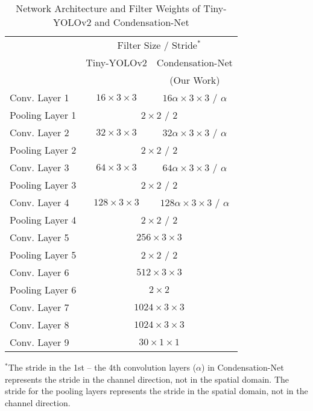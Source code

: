 \documentclass[10pt,twocolumn,letterpaper]{article}
\begin{document}
\begin{table}
\begin{center}
\begin{tabular}{l|c|c}
\hline
  & \multicolumn{2}{c}{Filter Size / Stride$^{*}$}   \\
  \cline{2-3}
  & Tiny-YOLOv2 & Condensation-Net  \\
  &    ~\cite{Redmon17, Wai18}  & (Our Work)  \\
\hline\hline
Conv. Layer 1    & $16 \times 3 \times 3$    & $16 \alpha \times 3 \times 3$ / $\alpha$\\
\hline
Pooling Layer 1  & \multicolumn{2}{c}{$2 \times 2$ / $2$}\\          
\hline
Conv. Layer 2    & $32 \times 3 \times 3$    & $32 \alpha \times 3 \times 3$ / $\alpha$\\
\hline
Pooling Layer 2  & \multicolumn{2}{c}{$2 \times 2$ / $2$}\\          
\hline
Conv. Layer 3    & $64 \times 3 \times 3$    & $64 \alpha \times 3 \times 3$ / $\alpha$\\
\hline
Pooling Layer 3  & \multicolumn{2}{c}{$2 \times 2$ / $2$}\\          
\hline
Conv. Layer 4    & $128 \times 3 \times 3$   & $128 \alpha \times 3 \times 3$ / $\alpha$\\
\hline
Pooling Layer 4  & \multicolumn{2}{c}{$2 \times 2$ / $2$}\\          
\hline
Conv. Layer 5    & \multicolumn{2}{c}{$256 \times 3 \times 3$}\\          
\hline
Pooling Layer 5  & \multicolumn{2}{c}{$2 \times 2$ / $2$}\\          
\hline
Conv. Layer 6    & \multicolumn{2}{c}{$512 \times 3 \times 3$}\\          
\hline
Pooling Layer 6  & \multicolumn{2}{c}{$2 \times 2 $}\\          
\hline
Conv. Layer 7    & \multicolumn{2}{c}{$1024 \times 3 \times 3$}\\          
\hline
Conv. Layer 8    & \multicolumn{2}{c}{$1024 \times 3 \times 3$}\\          
\hline
Conv. Layer 9    & \multicolumn{2}{c}{$30 \times 1 \times 1$}\\          
\hline
\end{tabular}
\end{center}
{\small
$^{*}$The stride in the 1st -- the 4th convolution layers ($\alpha$) in Condensation-Net represents the stride in the channel direction, not in the spatial domain. The stride for the pooling layers represents the stride in the spatial domain, not in the channel direction.\\
}
\caption{Network Architecture and Filter Weights of Tiny-YOLOv2 and Condensation-Net}
\label{tab:network}
\end{table}
\end{document}
